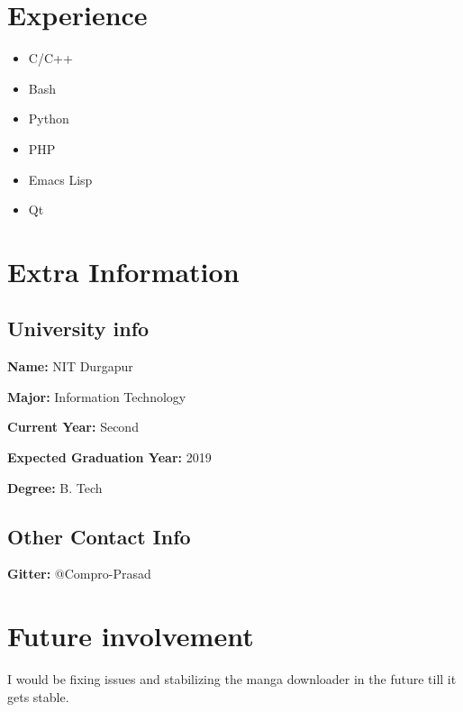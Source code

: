 \documentclass[11pt]{article}
\begin{document}
\section{Experience}
\label{sec:org7254591}
\begin{itemize}
\item C/C++
\item Bash
\item Python
\item PHP
\item Emacs Lisp
\item Qt
\end{itemize}

\section{Extra Information}
\label{sec:orgf560b22}

\subsection{University info}
\label{sec:orgb5fefe0}
\textbf{Name:} NIT Durgapur

\textbf{Major:} Information Technology

\textbf{Current Year:} Second

\textbf{Expected Graduation Year:} 2019

\textbf{Degree:} B. Tech

\subsection{Other Contact Info}
\label{sec:org480760c}
\textbf{Gitter:} @Compro-Prasad

\section{Future involvement}
\label{sec:orgb46b82e}
I would be fixing issues and stabilizing the manga downloader in the future
till it gets stable.
\end{document}
